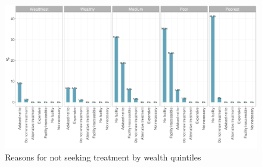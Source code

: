 \documentclass[12pt,a4paper]{article}
\begin{document}
\begin{figure}[H]

{\centering \includegraphics{kayahReport_files/figure-latex/fever4plot-1} 

}

\caption{Reasons for not seeking treatment by wealth quintiles}\label{fig:fever4plot}
\end{figure}
\end{document}
